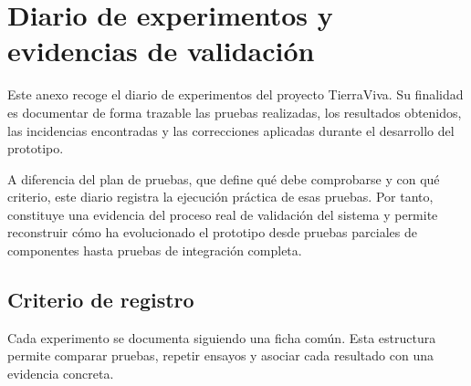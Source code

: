 \chapter{Diario de experimentos y evidencias de validación}
\label{anexo:diario_experimentos}

Este anexo recoge el diario de experimentos del proyecto TierraViva. Su finalidad es documentar de forma trazable las pruebas realizadas, los resultados obtenidos, las incidencias encontradas y las correcciones aplicadas durante el desarrollo del prototipo.

A diferencia del plan de pruebas, que define qué debe comprobarse y con qué criterio, este diario registra la ejecución práctica de esas pruebas. Por tanto, constituye una evidencia del proceso real de validación del sistema y permite reconstruir cómo ha evolucionado el prototipo desde pruebas parciales de componentes hasta pruebas de integración completa.

\section{Criterio de registro}

Cada experimento se documenta siguiendo una ficha común. Esta estructura permite comparar pruebas, repetir ensayos y asociar cada resultado con una evidencia concreta.

